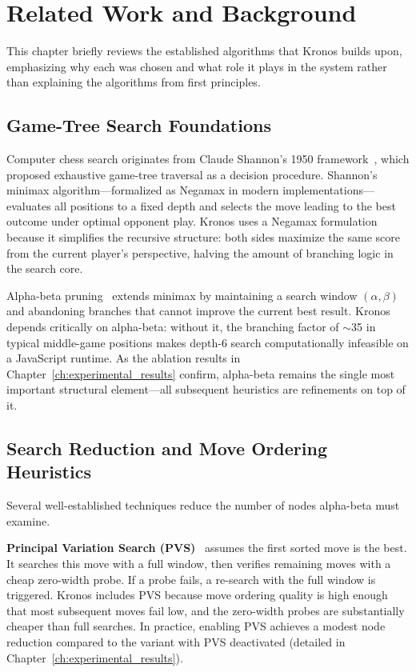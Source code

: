 \chapter{Related Work and Background}
\label{ch:related_work}

This chapter briefly reviews the established algorithms that Kronos builds upon, emphasizing why each was chosen and what role it plays in the system rather than explaining the algorithms from first principles.

\section{Game-Tree Search Foundations}
Computer chess search originates from Claude Shannon's 1950 framework~\cite{shannon1950xxii}, which proposed exhaustive game-tree traversal as a decision procedure. Shannon's minimax algorithm—formalized as Negamax in modern implementations—evaluates all positions to a fixed depth and selects the move leading to the best outcome under optimal opponent play. Kronos uses a Negamax formulation because it simplifies the recursive structure: both sides maximize the same score from the current player's perspective, halving the amount of branching logic in the search core.



Alpha-beta pruning~\cite{knuth1975analysis} extends minimax by maintaining a search window $(\alpha, \beta)$ and abandoning branches that cannot improve the current best result. Kronos depends critically on alpha-beta: without it, the branching factor of $\sim$35 in typical middle-game positions makes depth-6 search computationally infeasible on a JavaScript runtime. As the ablation results in Chapter~\ref{ch:experimental_results} confirm, alpha-beta remains the single most important structural element—all subsequent heuristics are refinements on top of it.

\section{Search Reduction and Move Ordering Heuristics}
Several well-established techniques reduce the number of nodes alpha-beta must examine.

\textbf{Principal Variation Search (PVS)}~\cite{marsland1982parallel} assumes the first sorted move is the best. It searches this move with a full window, then verifies remaining moves with a cheap zero-width probe. If a probe fails, a re-search with the full window is triggered. Kronos includes PVS because move ordering quality is high enough that most subsequent moves fail low, and the zero-width probes are substantially cheaper than full searches. In practice, enabling PVS achieves a modest node reduction compared to the variant with PVS deactivated (detailed in Chapter~\ref{ch:experimental_results}).

